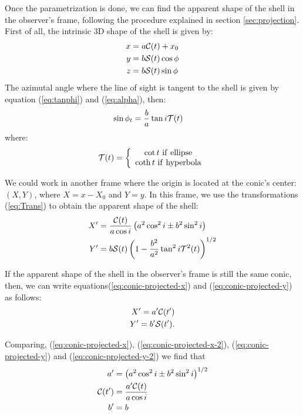 Once the parametrization is done, we can find the apparent shape of
the shell in the observer's frame, following the procedure explained
in section \ref{sec:projection}.  First of all, the intrinsic 3D shape of the shell is given by:
\begin{align}
x &= a\mathcal{C}(t)+x_0 \\ 
y &= b\mathcal{S}(t)\cos\phi \\
z &=  b\mathcal{S}(t)\sin\phi
\end{align}
The azimutal angle where the line of sight is tangent to the shell is given by equation (\ref{eq:tanphi}) and (\ref{eq:alpha}), then:
\begin{align}
\sin\phi_t &= \frac{b}{a}\tan i\mathcal{T}(t) 
\end{align}
where:
\begin{align}
\mathcal{T}(t) = \left\lbrace \begin{array}{c}
\cot t ~\mathrm{if~ellipse} \\
\coth t ~\mathrm{if~hyperbola}
\end{array}\right.
\end{align}

We could work in another frame where the origin is located at the conic's center: $(X,Y)$, where $X=x-X_0$ and $Y=y$.
In this frame, we use the transformations (\ref{eq:Trans})  to obtain the apparent shape of the shell:
\begin{align}
X' &= \frac{\mathcal{C}(t)}{a\cos i}\left(a^2\cos^2 i \pm b^2\sin^2 i\right)  \label{eq:conic-projected-x}\\
Y' &= b\mathcal{S}(t)\left(1-\frac{b^2}{a^2}\tan^2 i\mathcal{T}^2(t)\right)^{1/2}
\label{eq:conic-projected-y}
\end{align}


If the apparent shape of the shell in the observer's frame is still the same conic, then, we
can write equations(\ref{eq:conic-projected-x}) and (\ref{eq:conic-projected-y}) as follows:
\begin{align}
X' = a'\mathcal{C}( t') \label{eq:conic-projected-x-2} \\
Y' = b'\mathcal{S} (t') \label{eq:conic-projected-y-2} . 
\end{align}

Comparing, (\ref{eq:conic-projected-x}), (\ref{eq:conic-projected-x-2}), (\ref{eq:conic-projected-y}) and (\ref{eq:conic-projected-y-2}) we find that
\begin{align}
a' &= \left(a^2\cos^2 i \pm b^2\sin^2 i\right)^{1/2} \\
\mathcal{C}(t') &= \frac{a'\mathcal{C}(t)}{a\cos i} \\
b' &= b \label{eq:b-prime}
\end{align} 

